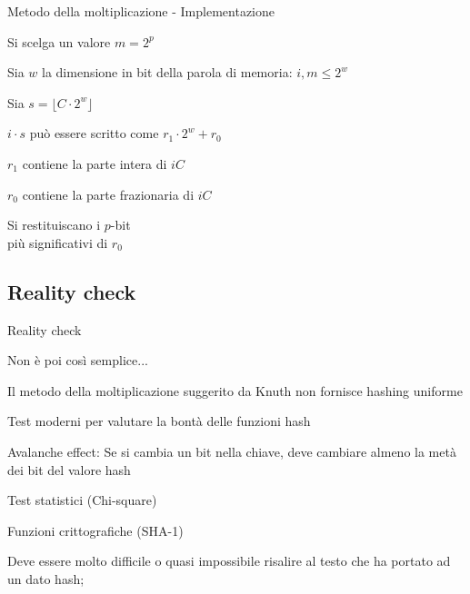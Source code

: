 \begin{frame}{Metodo della moltiplicazione - Implementazione}


\vspace{-6pt}
\BIL
\item Si scelga un valore $m=2^p$
\item Sia $w$ la dimensione in bit della parola di memoria: $i, m \leq 2^w$
\item Sia $s = \lfloor C \cdot 2^w \rfloor$
\item $i \cdot s$ può essere scritto come $r_1 \cdot 2^w + r_0$
	\BI	
	\item $r_1$ contiene la parte intera di $iC$
	\item $r_0$ contiene la parte frazionaria di $iC$
	\EI
\item Si restituiscano i $p$-bit\\ più significativi di $r_0$
\EIL



\end{frame}

\subsection{Reality check}

\begin{frame}{Reality check}

\vspace{-6pt}
\BIL
\item Non è poi così semplice...
\BI
\item Il metodo della moltiplicazione suggerito da Knuth non fornisce hashing uniforme
\EI
\item  Test moderni per valutare la bontà delle funzioni hash
\BI
\item \alert{Avalanche effect}: Se si cambia un bit nella chiave, deve cambiare almeno la metà dei bit del valore hash
\item Test statistici (\alert{Chi-square})
\EI

\item Funzioni crittografiche (SHA-1)
\BI
\item Deve essere molto difficile o quasi impossibile risalire al testo che ha portato ad un dato hash;
\EI
\EIL

\end{frame}

